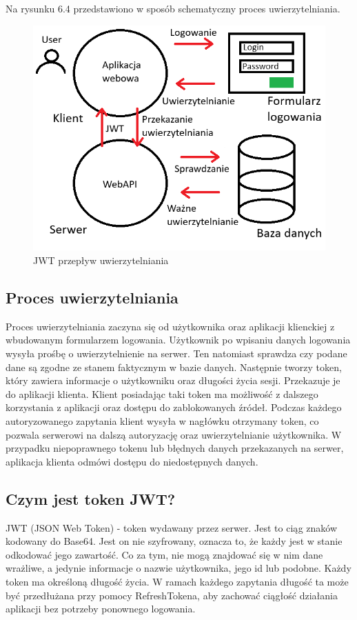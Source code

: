 \documentclass[a4paper,twoside,12pt]{book}
\begin{document}
Na rysunku 6.4 przedstawiono w sposób schematyczny proces uwierzytelniania.
\begin{figure}[H]
    \centering
    \includegraphics[width=1\textwidth]{jwt.png}
    \caption{JWT przepływ uwierzytelniania}
    \label{JWT}
\end{figure}

\subsection{Proces uwierzytelniania} 
Proces uwierzytelniania zaczyna się od użytkownika oraz aplikacji klienckiej z wbudowanym formularzem logowania. Użytkownik po wpisaniu danych logowania wysyła prośbę o uwierzytelnienie na serwer. Ten natomiast sprawdza czy podane dane są zgodne ze stanem faktycznym w bazie danych. Następnie tworzy token, który zawiera informacje o użytkowniku oraz długości życia sesji. Przekazuje je do aplikacji klienta. Klient posiadając taki token ma możliwość z dalszego korzystania z aplikacji oraz dostępu do zablokowanych źródeł. Podczas każdego autoryzowanego zapytania klient wysyła w nagłówku otrzymany token, co pozwala serwerowi na dalszą autoryzację oraz uwierzytelnianie użytkownika. W przypadku niepoprawnego tokenu lub błędnych danych przekazanych na serwer, aplikacja klienta odmówi dostępu do niedostępnych danych. 

\subsection{Czym jest token JWT?} 
JWT (JSON Web Token) - token wydawany przez serwer. Jest to ciąg znaków kodowany do Base64. Jest on nie szyfrowany, oznacza to, że każdy jest w stanie odkodować jego zawartość. Co za tym, nie mogą znajdować się w nim dane wrażliwe, a jedynie informacje o nazwie użytkownika, jego id lub podobne. Każdy token ma określoną długość życia. W ramach każdego zapytania długość ta może być przedłużana przy pomocy RefreshTokena, aby zachować ciągłość działania aplikacji bez potrzeby ponownego logowania. 
\end{document}
